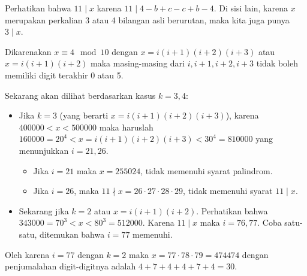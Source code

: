     Perhatikan bahwa $11 \mid x$ karena $11 \mid 4-b+c-c+b-4$. Di sisi lain, karena $x$ merupakan perkalian 3 atau 4 bilangan asli berurutan, maka kita juga punya $3 \mid x$. 
    
    Dikarenakan $x \equiv 4 \mod 10$ dengan $x=i(i+1)(i+2)(i+3)$ atau $x=i(i+1)(i+2)$ maka masing-masing dari $i, i+1, i+2, i+3$  tidak boleh memiliki digit terakhir 0 atau 5. 

    Sekarang akan dilihat berdasarkan kasus $k=3,4$:
    \begin{itemize}
        \item Jika $k=3$ (yang berarti $x=i(i+1)(i+2)(i+3)$), karena $400000 < x < 500000$ maka haruslah $160000 = 20^4 < x=i(i+1)(i+2)(i+3) < 30^4 = 810000$ yang menunjukkan $i=21,26$.
        \begin{itemize}
            \item Jika $i=21$ maka $x=255024$, tidak memenuhi syarat palindrom. 
            \item Jika $i=26$, maka $11 \nmid x=26\cdot27\cdot28\cdot29$, tidak memenuhi syarat $11 \mid x$. 
        \end{itemize}
        \item Sekarang jika $k=2$ atau $x=i(i+1)(i+2)$. Perhatikan bahwa $343000 = 70^3 < x < 80^3 = 512000$. Karena $11\mid x$ maka $i=76,77$. Coba satu-satu, ditemukan bahwa $i=77$ memenuhi.
    \end{itemize}
    Oleh karena $i=77$ dengan $k=2$ maka $x=77\cdot78\cdot79=474474$ dengan penjumalahan digit-digitnya adalah $4+7+4+4+7+4=\boxed{30}$.

    


